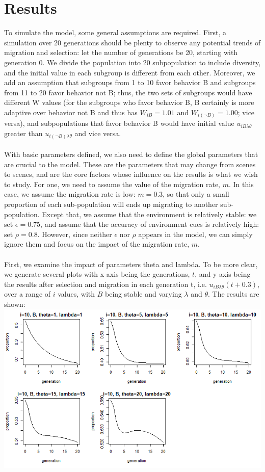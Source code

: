 \documentclass[a4paper,8pt]{extarticle}
\begin{document}
\section{Results}
To simulate the model, some general assumptions are required. First, a simulation over 20 generations should be plenty to observe any potential trends of migration and selection: let the number of generations be 20, starting with generation 0. We divide the population into 20 subpopulation to include diversity, and the initial value in each subgroup is different from each other. Moreover, we add an assumption that subgroups from 1 to 10 favor behavior B and subgroups from 11 to 20 favor behavior not B; thus, the two sets of subgroups would have different W values (for the subgroups who favor behavior B, B certainly is more adaptive over behavior not B and thus has $W_{iB} = 1.01$ and $W_{i(\lnot{B})} = 1.00$; vice versa), and subpopulations that favor behavior B would have initial value $u_{iB\lambda\theta}$ greater than $u_{i(\lnot B)\lambda\theta}$ and vice versa.
\\
\\
With basic parameters defined, we also need to define the global parameters that are crucial to the model. These are the parameters that may change from scenes to scenes, and are the core factors whose influence on the results is what we wish to study. For one, we need to assume the value of the migration rate, $m$. In this case, we  assume the migration rate is low: $m = 0.3$, so that only a small proportion of each sub-population will ends up migrating to another sub-population. Except that, we assume that the environment is relatively stable: we set $\epsilon = 0.75$, and assume that the accuracy of environment cues is relatively high: set $\rho = 0.8$. However, since neither $\epsilon$ nor $\rho$ appears in the model, we can simply ignore them and focus on the impact of the migration rate, $m$.
\\
\\
First, we examine the impact of parameters theta and lambda. To be more clear, we generate several plots with x axis being the generations, $t$, and y axis being the results after selection and migration in each generation t, i.e. $u_{iB\lambda\theta}(t + 0.3)$, over a range of $i$ values, with $B$ being stable and varying $\lambda$ and $\theta$. The results are shown:
\\
\includegraphics[scale = 0.6]{00003d.png}
\end{document}
